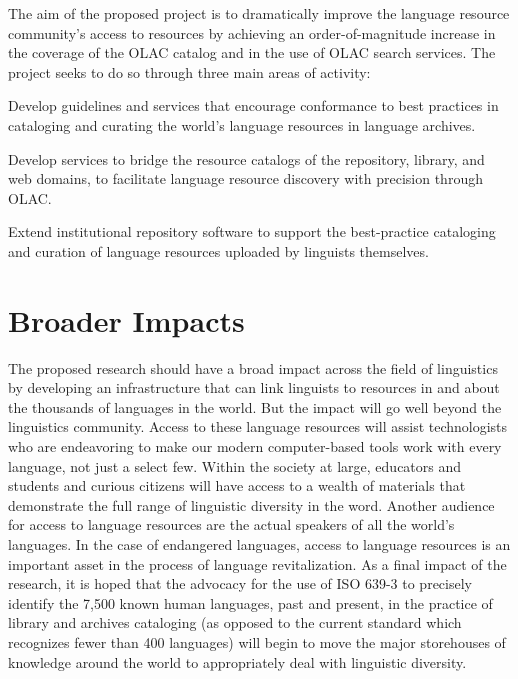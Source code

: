 \documentclass[11pt]{nsf}
\begin{document}
%
%
The aim of the proposed project is to dramatically improve the language
resource community's access to resources by achieving an 
order-of-magnitude increase in the coverage of the OLAC catalog
and in the use of OLAC search services.
The project seeks to do so through three main areas of activity:
%
\begin{description}\setlength{\itemsep}{0pt}\setlength{\parskip}{0pt}
  \item[Access to Language Resources in Archives:]
    Develop guidelines and services that encourage conformance to best
    practices in cataloging and curating the world's language resources
    in language archives.

  \item[Access to Language Resources on the Web:]
    Develop services to bridge the resource catalogs of the
    repository, library, and web domains,
    to facilitate language resource discovery with precision through OLAC.

  \item[Access to Language Resources from the Field:]
    Extend institutional repository software to support the
    best-practice cataloging and curation of language resources
    uploaded by linguists themselves.
\end{description}

\section*{Broader Impacts}

The proposed research should have a broad impact across the field of
linguistics by developing an infrastructure that can link linguists to
resources in and about the thousands of languages in the world. But the
impact will go well beyond the linguistics community. Access to these
language resources will assist technologists who are endeavoring to make
our modern computer-based tools work with every language, not just a select
few.  Within the society at large, educators and students and curious
citizens will have access to a wealth of materials that demonstrate the
full range of linguistic diversity in the word. Another audience for access
to language resources are the actual speakers of all the world's languages.
In the case of endangered languages, access to language resources is an
important asset in the process of language revitalization. As a final
impact of the research, it is hoped that the advocacy for the use of ISO
639-3 to precisely identify the 7,500 known human languages, past and
present, in the practice of library and archives cataloging (as opposed to
the current standard which recognizes fewer than 400 languages) will begin
to move the major storehouses of knowledge around the world to
appropriately deal with linguistic diversity.
\end{document}
